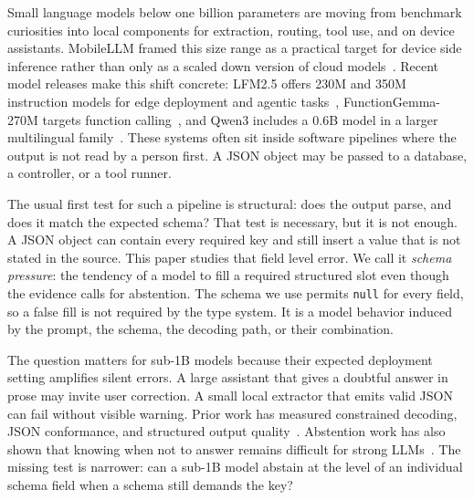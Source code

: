 \documentclass{svproc}
\newcommand{\cnull}{\texttt{null}\xspace}
\begin{document}
Small language models below one billion parameters are moving from benchmark curiosities into local components for extraction, routing, tool use, and on device assistants. MobileLLM framed this size range as a practical target for device side inference rather than only as a scaled down version of cloud models~\cite{mobilellm2024}. Recent model releases make this shift concrete: LFM2.5 offers 230M and 350M instruction models for edge deployment and agentic tasks~\cite{liquidlfm25}, FunctionGemma-270M targets function calling~\cite{functiongemma}, and Qwen3 includes a 0.6B model in a larger multilingual family~\cite{qwen3tr}. These systems often sit inside software pipelines where the output is not read by a person first. A JSON object may be passed to a database, a controller, or a tool runner.

The usual first test for such a pipeline is structural: does the output parse, and does it match the expected schema? That test is necessary, but it is not enough. A JSON object can contain every required key and still insert a value that is not stated in the source. This paper studies that field level error. We call it \emph{schema pressure}: the tendency of a model to fill a required structured slot even though the evidence calls for abstention. The schema we use permits \cnull for every field, so a false fill is not required by the type system. It is a model behavior induced by the prompt, the schema, the decoding path, or their combination.

The question matters for sub-1B models because their expected deployment setting amplifies silent errors. A large assistant that gives a doubtful answer in prose may invite user correction. A small local extractor that emits valid JSON can fail without visible warning. Prior work has measured constrained decoding, JSON conformance, and structured output quality~\cite{jsonschemabench,structuredoutputbench,llmstructbench}. Abstention work has also shown that knowing when not to answer remains difficult for strong LLMs~\cite{abstentionbench}. The missing test is narrower: can a sub-1B model abstain at the level of an individual schema field when a schema still demands the key?
\end{document}
